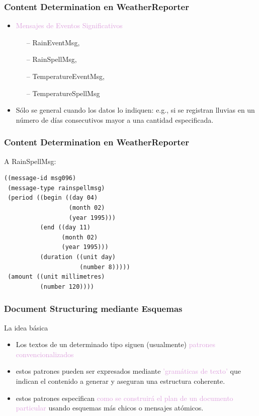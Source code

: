 \documentclass[compress,color=usenames]{beamer}
\newcommand{\mH}[1]{\textcolor{Plum}{#1}}
\begin{document}
\begin{frame}
\frametitle{Content Determination en WeatherReporter}

\begin{itemize}
\item { \mH{Mensajes de Eventos Significativos}}

\ \ \ -- RainEventMsg, 

\ \ \ -- RainSpellMsg, 

\ \ \ -- TemperatureEventMsg, 

\ \ \ -- TemperatureSpellMsg

\item S\'olo se general cuando los datos lo indiquen: e.g., si se registran lluvias en un n\'umero de d\'ias consecutivos mayor a una cantidad especificada. 
\end{itemize}
\end{frame}

\begin{frame}[fragile]
\frametitle{Content Determination en WeatherReporter}

 { {A RainSpellMsg:}}
\begin{verbatim}
((message-id msg096)
 (message-type rainspellmsg)
 (period ((begin ((day 04)
                  (month 02)
                  (year 1995)))
          (end ((day 11)
                (month 02)
                (year 1995)))
          (duration ((unit day)
                     (number 8)))))
 (amount ((unit millimetres)
          (number 120))))
\end{verbatim}
\end{frame}

\begin{frame}
\frametitle{Document Structuring mediante Esquemas}

La idea b\'asica
\begin{itemize}
\item Los textos de un determinado tipo siguen (usualmente) \mH{patrones convencionalizados} 
\item estos patrones pueden ser expresados mediante \mH{'gram\'aticas de texto'} que indican el contenido a 
generar y aseguran una estructura coherente. 
\item estos patrones especifican \mH{como se construir\'a el plan de un documento particular} usando esquemas
m\'as chicos o mensajes at\'omicos.  
\end{itemize}
\end{frame}
\end{document}
